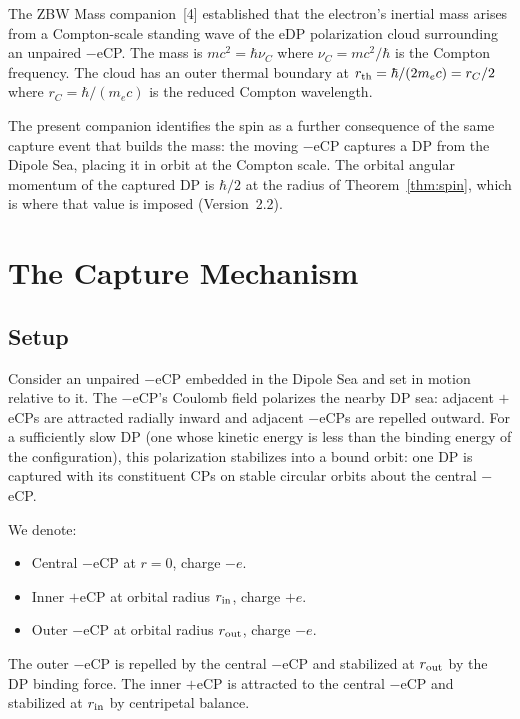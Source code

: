 \documentclass[12pt]{article}
\newcommand{\nuC}{\nu_C}
\newcommand{\rC}{r_C}
\newcommand{\rin}{r_{\rm in}}
\newcommand{\rout}{r_{\rm out}}
\begin{document}
The ZBW Mass companion~[4] established that the electron's inertial
mass arises from a Compton-scale standing wave of the eDP polarization
cloud surrounding an unpaired $-$eCP.  The mass is $mc^2 = \hbar\nuC$
where $\nuC = mc^2/\hbar$ is the Compton frequency.  The cloud has an
outer thermal boundary at $r_{\rm th} = \hbar/(2m_e c) = \rC/2$ where
$\rC = \hbar/(m_e c)$ is the reduced Compton wavelength.

The present companion identifies the spin as a further consequence of
the same capture event that builds the mass: the moving $-$eCP captures
a DP from the Dipole Sea, placing it in orbit at the Compton scale.
The orbital angular momentum of the captured DP is $\hbar/2$ at the radius
of Theorem~\ref{thm:spin}, which is where that value is imposed
(Version~2.2).

\section{The Capture Mechanism}
\label{sec:capture}

\subsection{Setup}

Consider an unpaired $-$eCP embedded in the Dipole Sea and set in
motion relative to it.  The $-$eCP's Coulomb field polarizes the nearby
DP sea: adjacent $+$eCPs are attracted radially inward and adjacent
$-$eCPs are repelled outward.  For a sufficiently slow DP (one whose
kinetic energy is less than the binding energy of the configuration),
this polarization stabilizes into a bound orbit: one DP is captured
with its constituent CPs on stable circular orbits about the central
$-$eCP.

We denote:
\begin{itemize}[noitemsep]
  \item Central $-$eCP at $r = 0$, charge $-e$.
  \item Inner $+$eCP at orbital radius $\rin$, charge $+e$.
  \item Outer $-$eCP at orbital radius $\rout$, charge $-e$.
\end{itemize}

The outer $-$eCP is repelled by the central $-$eCP and stabilized at
$\rout$ by the DP binding force.  The inner $+$eCP is attracted to the
central $-$eCP and stabilized at $\rin$ by centripetal balance.
\end{document}
